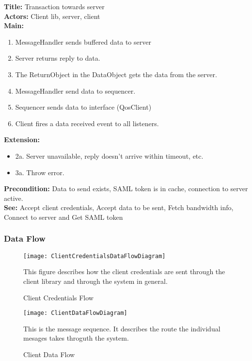		\textbf{Title:} Transaction towards server \\
		\textbf{Actors:} Client lib, server, client \\
		\textbf{Main:}
		\begin{enumerate}
			\item MessageHandler sends buffered data to server
			\item Server returns reply to data.
			\item The ReturnObject in the DataObject gets the data from the server.
			\item MessageHandler send data to sequencer.
			\item Sequencer sends data to interface (QosClient)
			\item Client fires a data received event to all listeners.
		\end{enumerate}
		\textbf{Extension:}
		\begin{itemize}
			 \item[] 2a. Server unavailable, reply doesn’t arrive within timeout, etc.
			 \item[] 3a. Throw error.
		\end{itemize}
		\textbf{Precondition:} Data to send exists, SAML token is in cache, connection to server active.\\
		\textbf{See:} Accept client credentials, Accept data to be sent, Fetch bandwidth info, Connect to server and Get SAML token
		
	\subsubsection{Data Flow}\label{textual client data flow}
        
    \begin{figure}[h]
        \centering
        \texttt{[image: ClientCredentialsDataFlowDiagram]}
        \caption{Client Credentials Flow}
        This figure describes how the client credentials are sent through the client library and through the system in general. 
        \label{fig:ClientCredentialsDataFlowDiagram}
    \end{figure}
    
    \begin{figure}[h]
        \centering
        \texttt{[image: ClientDataFlowDiagram]}
        \caption{Client Data Flow}
        This is the message sequence. It describes the route the individual mesages takes throguth the system. 
        \label{fig:ClientDataFlowDiagram}
    \end{figure}
    
